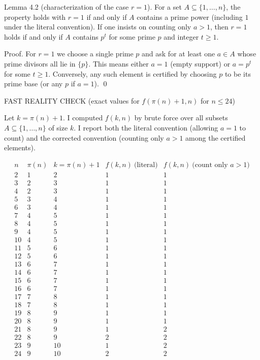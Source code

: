 Lemma 4.2 (characterization of the case $r=1$).
For a set $A\subseteq\{1,\dots,n\}$, the property holds with $r=1$ if and only if $A$ contains a prime power (including $1$ under the literal convention).
If one insists on counting only $a>1$, then $r=1$ holds if and only if $A$ contains $p^t$ for some prime $p$ and integer $t\ge 1$.

Proof.
For $r=1$ we choose a single prime $p$ and ask for at least one $a\in A$ whose prime divisors all lie in $\{p\}$.
This means either $a=1$ (empty support) or $a=p^t$ for some $t\ge 1$.
Conversely, any such element is certified by choosing $p$ to be its prime base (or any $p$ if $a=1$). \qed

FAST REALITY CHECK (exact values for $f(\pi(n)+1,n)$ for $n\le 24$)

Let $k=\pi(n)+1$.
I computed $f(k,n)$ by brute force over all subsets $A\subseteq\{1,\dots,n\}$ of size $k$.
I report both the literal convention (allowing $a=1$ to count) and the corrected convention (counting only $a>1$ among the certified elements).

\[
\begin{array}{c|c|c|c|c}
 n & \pi(n) & k=\pi(n)+1 & f(k,n)\ \text{(literal)} & f(k,n)\ \text{(count only }a>1)\\\hline
 2&1&2&1&1\\
 3&2&3&1&1\\
 4&2&3&1&1\\
 5&3&4&1&1\\
 6&3&4&1&1\\
 7&4&5&1&1\\
 8&4&5&1&1\\
 9&4&5&1&1\\
 10&4&5&1&1\\
 11&5&6&1&1\\
 12&5&6&1&1\\
 13&6&7&1&1\\
 14&6&7&1&1\\
 15&6&7&1&1\\
 16&6&7&1&1\\
 17&7&8&1&1\\
 18&7&8&1&1\\
 19&8&9&1&1\\
 20&8&9&1&1\\
 21&8&9&1&2\\
 22&8&9&2&2\\
 23&9&10&1&2\\
 24&9&10&2&2
\end{array}
\]

